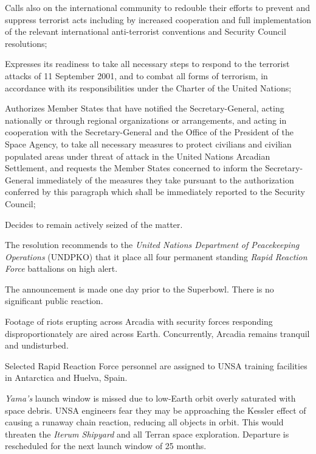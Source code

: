 \item Calls also on the international community to redouble their efforts to prevent and suppress terrorist acts including by increased cooperation and full implementation of the relevant international anti-terrorist conventions and Security Council resolutions;

\item Expresses its readiness to take all necessary steps to respond to the terrorist attacks of 11 September 2001, and to combat all forms of terrorism, in accordance with its responsibilities under the Charter of the United Nations;

\item Authorizes Member States that have notified the Secretary-General, acting nationally or through regional organizations or arrangements, and acting in cooperation with the Secretary-General and the Office of the President of the Space Agency, to take all necessary measures to protect civilians and civilian populated areas under threat of attack in the United Nations Arcadian Settlement, and requests the Member States concerned to inform the Secretary-General immediately of the measures they take pursuant to the authorization conferred by this paragraph which shall be immediately reported to the Security Council;

\item Decides to remain actively seized of the matter.
\stopitemize
\stopTimelineDocument

The resolution recommends to the {\it United Nations Department of Peacekeeping Operations} (UNDPKO) that it place all four permanent standing {\it Rapid Reaction Force} battalions on high alert.

The announcement is made one day prior to the Superbowl. There is no significant public reaction.
\StopTimelineDate

Footage of riots erupting across Arcadia with security forces responding disproportionately are aired across Earth. Concurrently, Arcadia remains tranquil and undisturbed.
\StopTimelineDate

Selected Rapid Reaction Force personnel are assigned to UNSA training facilities in Antarctica and Huelva, Spain.
\StopTimelineDate

{\it Yama's} launch window is missed due to low-Earth orbit overly saturated with space debris. UNSA engineers fear they may be approaching the Kessler effect of causing a runaway chain reaction, reducing all objects in orbit. This would threaten the {\it Iterum Shipyard} and all Terran space exploration. Departure is rescheduled for the next launch window of 25 months.
\StopTimelineDate

